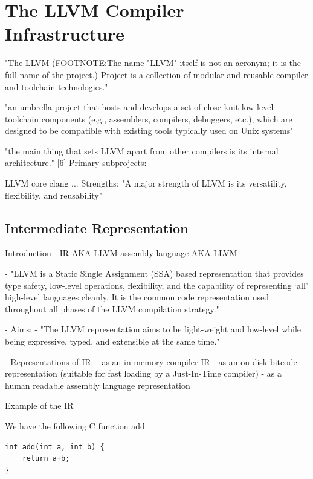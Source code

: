 \documentclass[12pt, twoside]{fithesis2}
\renewcommand{\_}{\leavevmode \kern0.07em\vbox{\hrule width0.4em}}
\begin{document}
\chapter{The LLVM Compiler Infrastructure}
\label{chap:llvm}

"The LLVM (FOOTNOTE:The name "LLVM" itself is not an acronym; it is the full
name of the project.) Project is a collection of modular and reusable compiler
and toolchain technologies." \cite{llvm}

"an umbrella project that hosts and develops a set of close-knit low-level
toolchain components (e.g., assemblers, compilers, debuggers, etc.), which are
designed to be compatible with existing tools typically used on Unix systems"

"the main thing that sets LLVM apart from other compilers is its internal
architecture." [6] Primary subprojects:

LLVM core clang ...  Strengths: "A major strength of LLVM is its versatility,
flexibility, and reusability"

\section{Intermediate Representation}
\label{sec:llvm-ir}

Introduction
- IR AKA LLVM assembly language AKA LLVM

- "LLVM is a Static Single Assignment (SSA) based representation that provides
type safety, low-level operations, flexibility, and the capability of
representing ‘all’ high-level languages cleanly. It is the common code
representation used throughout all phases of the LLVM compilation strategy."

- Aims:
 - "The LLVM representation aims to be light-weight and low-level while being
 expressive, typed, and extensible at the same time."

- Representations of IR:
 - as an in-memory compiler IR
 - as an on-disk bitcode representation (suitable for fast loading by a
 Just-In-Time compiler)
 - as a human readable assembly language representation

Example of the IR

We have the following C function add

\begin{verbatim}
int add(int a, int b) {
    return a+b;
}
\end{verbatim}
\end{document}
